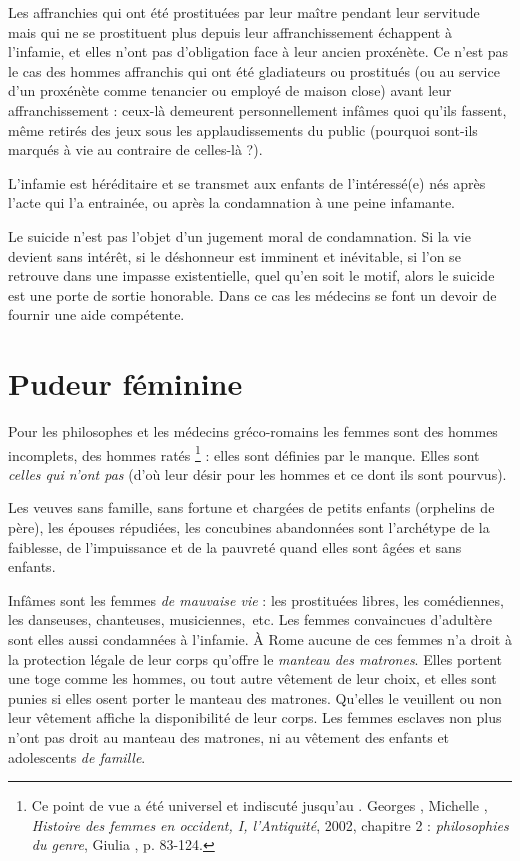  Les affranchies qui ont été prostituées par leur maître pendant leur servitude mais qui ne se prostituent plus depuis leur affranchissement échappent à l'infamie, et elles n'ont pas d'obligation face à leur ancien proxénète. Ce n'est pas le cas des hommes affranchis qui ont été gladiateurs ou prostitués (ou au service d'un proxénète comme tenancier ou employé de maison close) avant leur affranchissement : ceux-là demeurent personnellement infâmes quoi qu'ils fassent, même retirés des jeux sous les applaudissements du public (pourquoi sont-ils marqués à vie au contraire de celles-là ?). 

 L'infamie est héréditaire et se transmet aux enfants de l'intéressé(e) nés après l'acte qui l'a entrainée, ou après la condamnation à une peine infamante.

 Le suicide n'est pas l'objet d'un jugement moral de condamnation. Si la vie devient sans intérêt, si le déshonneur est imminent et inévitable, si l'on se retrouve dans une impasse existentielle, quel qu'en soit le motif, alors le suicide est une porte de sortie honorable. Dans ce cas les médecins se font un devoir de fournir une aide compétente. 


\section{Pudeur féminine}

 Pour les philosophes et les médecins gréco-romains les femmes sont des hommes incomplets, des hommes ratés%
\footnote{Ce point de vue a été universel et indiscuté jusqu'au . Georges , Michelle , \emph{Histoire des femmes en occident, I, l'Antiquité}, 2002, chapitre 2 : \emph{philosophies du genre}, Giulia , p. 83-124.}%
 : elles sont définies par le manque. Elles sont \emph{celles qui n'ont pas} (d'où leur désir pour les hommes et ce dont ils sont pourvus).

 Les veuves sans famille, sans fortune et chargées de petits enfants (orphelins de père), les épouses répudiées, les concubines abandonnées sont l'archétype de la faiblesse, de l'impuissance et de la pauvreté quand elles sont âgées et sans enfants. 

 Infâmes sont les femmes \emph{de mauvaise vie} : les prostituées libres, les comédiennes, les danseuses, chanteuses, musiciennes,~etc. Les femmes convaincues d'adultère sont elles aussi condamnées à l'infamie. À Rome aucune de ces femmes n'a droit à la protection légale de leur corps qu'offre le \emph{manteau des matrones}. Elles portent une toge comme les hommes, ou tout autre vêtement de leur choix, et elles sont punies si elles osent porter le manteau des matrones. Qu'elles le veuillent ou non leur vêtement affiche la disponibilité de leur corps. Les femmes esclaves non plus n'ont pas droit au manteau des matrones, ni au vêtement des enfants et adolescents \emph{de famille}.


